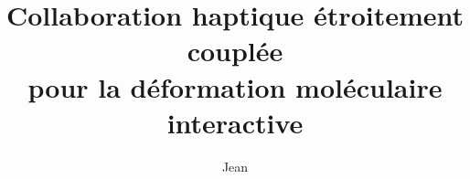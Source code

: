 \documentclass[french,dvips]{mybeamer}
\title{Collaboration haptique étroitement couplée\\pour la déformation moléculaire interactive}
\author{Jean \myname{Simard}}
\date{\mydate[datestyle=long]{01/02/2012}}
\begin{document}
	\begin{frame}
		\titlepage
	\end{frame}
\end{document}
